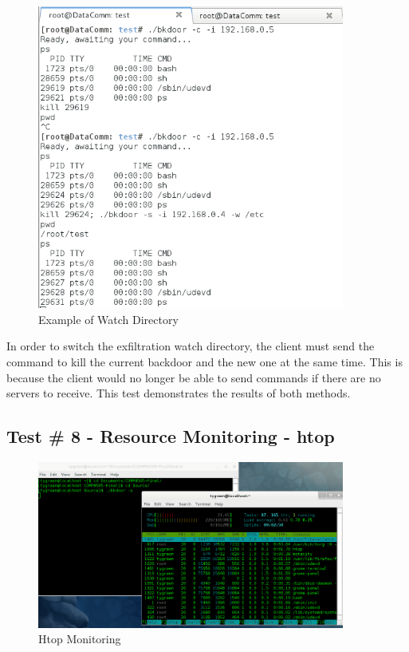 \documentclass[titlepage]{article}
\begin{document}
\begin{figure}[htb]                                                                       
  \begin{center}
    \includegraphics[width=0.9\textwidth]{Pictures/Watch.png}
  \end{center}
  \caption{Example of Watch Directory}
  \label{fig:watch}
\end{figure}

In order to switch the exfiltration watch directory, the client must send the command to
kill the current backdoor and the new one at the same time.  This is because the client
would no longer be able to send commands if there are no servers to receive.  This test
demonstrates the results of both methods.

\clearpage

\subsection{Test \# 8 - Resource Monitoring - htop}

\begin{figure}[htb]                                                                       
  \begin{center}
    \includegraphics[width=0.9\textwidth]{Pictures/htop.png}
  \end{center}
  \caption{Htop Monitoring}
  \label{fig:htop}
\end{figure}
\end{document}
